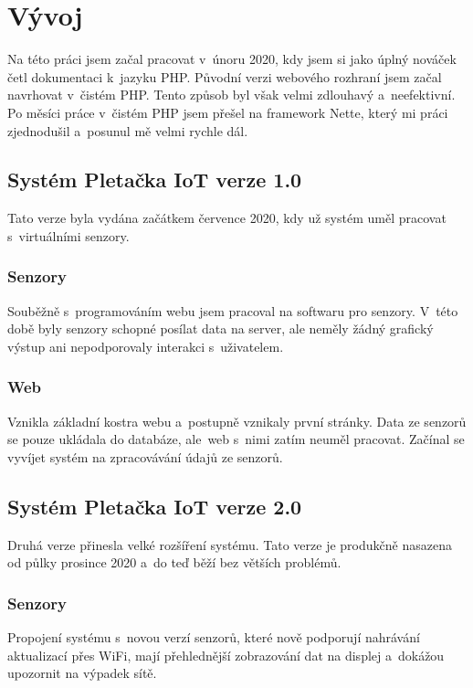 \chapter{Vývoj}
Na této práci jsem začal pracovat v~únoru 2020, kdy jsem si jako úplný nováček četl dokumentaci k~jazyku PHP. 
Původní verzi webového rozhraní jsem začal navrhovat v~čistém PHP. Tento způsob byl však velmi zdlouhavý a~neefektivní.
Po měsíci práce v~čistém PHP jsem přešel na framework Nette, který mi práci zjednodušil a~posunul mě velmi rychle dál. 


\section{Systém Pletačka IoT verze 1.0}
Tato verze byla vydána začátkem července 2020, kdy už systém uměl pracovat s~virtuálními senzory.


\subsection{Senzory}
Souběžně s~programováním webu jsem pracoval na softwaru pro senzory.
V~této době byly senzory schopné posílat data na server, ale neměly žádný grafický výstup ani nepodporovaly interakci s~uživatelem.

\subsection{Web}
Vznikla základní kostra webu a~postupně vznikaly první stránky.
Data ze senzorů se pouze ukládala do databáze, ale~web s~nimi zatím neuměl pracovat.
Začínal se vyvíjet systém na zpracovávání údajů ze senzorů.



\section{Systém Pletačka IoT verze 2.0}
Druhá verze přinesla velké rozšíření systému.
Tato verze je produkčně nasazena od půlky prosince 2020 a~do teď běží bez větších problémů.


\subsection{Senzory}
Propojení systému s~novou verzí senzorů, které nově podporují nahrávání aktualizací přes WiFi, mají přehlednější zobrazování dat na displej a~dokážou upozornit na výpadek sítě.



